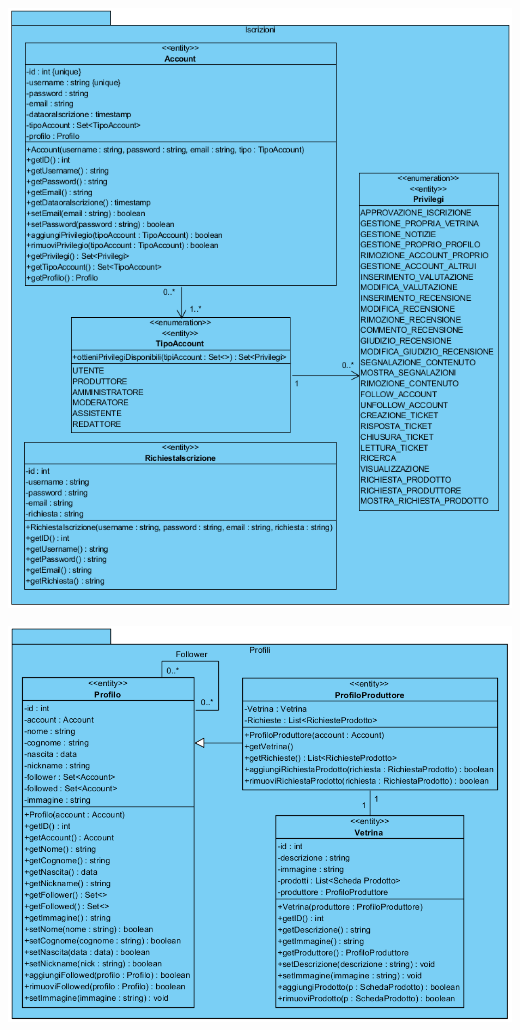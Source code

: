 \begin{center}
			\includegraphics[width=\textwidth]{assets/visualParadigm/classi/Iscrizioni}
\end{center}

\begin{center}
			\includegraphics[width=\textwidth]{assets/visualParadigm/classi/Profili}
\end{center}

